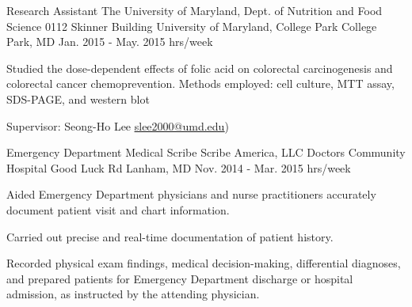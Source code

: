 \begin{cventries}

  \cventry
    {Research Assistant} %
    {The University of Maryland, Dept. of Nutrition and Food Science} %
    {0112 Skinner Building \newline
University of Maryland, College Park \newline
College Park, MD} %
    {Jan. 2015 - May. 2015  hrs/week} %
    {
      \begin{cvitems} %
        \item {Studied the dose-dependent effects of folic acid on colorectal carcinogenesis and colorectal cancer chemoprevention. Methods employed: cell culture, MTT assay, SDS-PAGE, and western blot}
        \item{Supervisor: Seong-Ho Lee
        {\underline{\href{mailto:slee2000@umd.edu}{slee2000@umd.edu}}})}
      \end{cvitems}
    }


  \cventry
    {Emergency Department Medical Scribe} %
    {Scribe America, LLC } %
    {Doctors Community Hospital  Good Luck Rd \newline
Lanham, MD
} %
    {Nov. 2014 - Mar. 2015  hrs/week} %
    {
      \begin{cvitems} %
        \item {Aided Emergency Department physicians and nurse practitioners accurately document patient visit and chart information.}
        \item{Carried out precise and real-time documentation of patient history.}
        \item{Recorded physical exam findings, medical decision-making, differential diagnoses, and prepared patients for Emergency Department discharge or hospital admission, as instructed by the attending physician.}
      \end{cvitems}
    }




\end{cventries}
